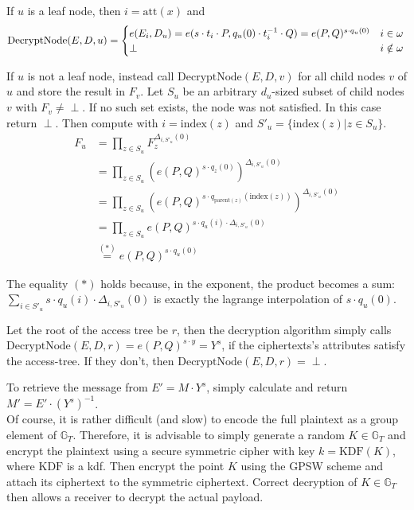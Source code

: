 If $u$ is a leaf node, then $i = \text{att}(x)$ and 
\begin{equation}
    \text{DecryptNode}(E, D, u) = \begin{cases}
        e(E_i, D_u) = e(s \cdot t_i \cdot P, q_u(0) \cdot t_i^{-1} \cdot Q) = e(P, Q)^{s\cdot q_u(0)} & i \in \omega\\
        \perp & i \notin \omega
    \end{cases}\\
\end{equation}

If $u$ is not a leaf node, instead call $\text{DecryptNode}(E, D, v)$ for all child nodes $v$ of $u$ and store the result in $F_v$.
Let $S_u$ be an arbitrary $d_u$-sized subset of child nodes $v$ with $F_v \neq \perp$. If no such set exists, the node was not satisfied. In this case return $\perp$.
Then compute with $i = \text{index}(z)$ and $S'_u = \{\text{index}(z) | z \in S_u\}$.
\begin{equation}
    \begin{split}
        F_u &= \prod_{z \in S_u} F_z^{\Delta_{i,S'_u}(0)}\\
        &= \prod_{z \in S_u} (e(P,Q)^{s\cdot q_z(0)})^{\Delta_{i,S'_u}(0)}\\
        &= \prod_{z \in S_u} (e(P,Q)^{s\cdot q_{\text{parent}(z)}(\text{index}(z))})^{\Delta_{i,S'_u}(0)}\\
        &= \prod_{z \in S_u} e(P,Q)^{s\cdot q_u(i) \cdot \Delta_{i,S'_u}(0)}\\
        &\stackrel{(*)}{=} e(P,Q)^{s \cdot q_u(0)}
    \end{split}
\end{equation}

The equality $(*)$ holds because, in the exponent, the product becomes a sum: $\sum_{i\in S'_u} s \cdot q_u(i) \cdot \Delta_{i,S'_u}(0)$ is exactly the lagrange interpolation of $s \cdot q_u(0)$.

Let the root of the access tree be $r$, then the decryption algorithm simply calls $\text{DecryptNode}(E, D, r) = e(P,Q)^{s \cdot y} = Y^s$, if the ciphertexts's attributes satisfy the \gls{access-tree}.
If they don't, then $\text{DecryptNode}(E, D, r) = \perp$.

To retrieve the message from $E' = M \cdot Y^s$, simply calculate and return $M' = E' \cdot (Y^s)^{-1}$.\\

Of course, it is rather difficult (and slow) to encode the full plaintext as a group element of $\mathbb{G}_T$.
Therefore, it is advisable to simply generate a random $K \in \mathbb{G}_T$ and encrypt the plaintext using a secure symmetric cipher with key $k = \text{KDF}(K)$, where $\text{KDF}$ is a \gls{kdf}.
Then encrypt the point $K$ using the GPSW scheme and attach its ciphertext to the symmetric ciphertext.
Correct decryption of $K \in \mathbb{G}_T$ then allows a receiver to decrypt the actual payload.

